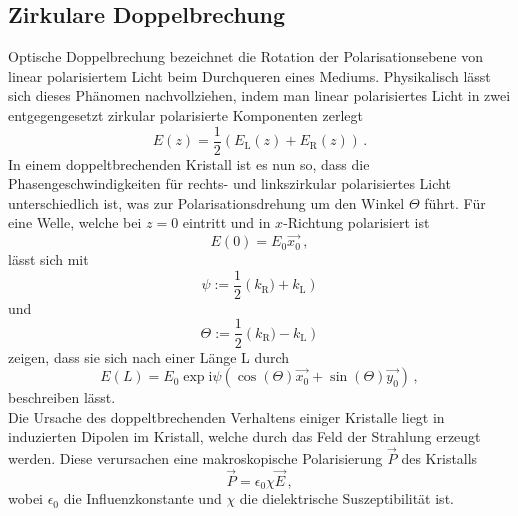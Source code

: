\subsection{Zirkulare Doppelbrechung}
Optische Doppelbrechung bezeichnet die Rotation der Polarisationsebene von linear polarisiertem Licht beim Durchqueren eines Mediums. Physikalisch lässt sich dieses Phänomen nachvollziehen, indem man linear polarisiertes Licht in zwei entgegengesetzt zirkular polarisierte Komponenten zerlegt
\begin{equation}
E(z)=\frac{1}{2}(E_\text{L}(z)+E_\text{R}(z))\,.
\end{equation}
In einem doppeltbrechenden Kristall ist es nun so, dass die Phasengeschwindigkeiten für rechts- und linkszirkular polarisiertes Licht unterschiedlich ist, was zur Polarisationsdrehung um den Winkel $\Theta$ führt. Für eine Welle, welche bei $z=0$ eintritt und in $x$-Richtung polarisiert ist
\begin{equation}
  E(0)=E_0\vec{x_0}\,,
\end{equation}
lässt sich mit
\begin{equation}
  \psi:=\frac{1}{2}\left(k_\text{R})+k_\text{L}\right)
\end{equation}
und
\begin{equation}
\Theta:=\frac{1}{2}\left(k_\text{R})-k_\text{L}\right)
\end{equation}
zeigen, dass sie sich nach einer Länge L durch
\begin{equation}
E(L)=E_0 \exp{\text{i}\psi}\left(\cos(\Theta)\vec{x_0}+\sin(\Theta)\vec{y_0}\right)\,,
\end{equation}
beschreiben lässt.\\
Die Ursache des doppeltbrechenden Verhaltens einiger Kristalle liegt in induzierten Dipolen im Kristall, welche durch das Feld der Strahlung erzeugt werden. Diese verursachen eine makroskopische Polarisierung $\vec{P}$ des Kristalls
\begin{equation}
\vec{P}=\epsilon_0\chi\vec{E}\,,
\end{equation}
wobei $\epsilon_0$ die Influenzkonstante und $\chi$ die dielektrische Suszeptibilität ist.
